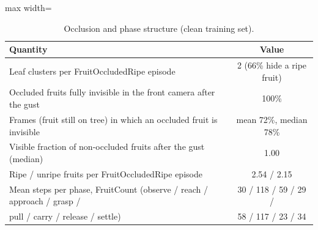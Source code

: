 \begin{table}[t]
\centering
\caption{Occlusion and phase structure (clean training set).}
\label{tab:occlusion}
\small
\begin{adjustbox}{max width=\textwidth}\begin{tabular}{lc}
\toprule
Quantity & Value\\
\midrule
Leaf clusters per FruitOccludedRipe episode & 2 (66\% hide a ripe fruit)\\
Occluded fruits fully invisible in the front camera after the gust & 100\%\\
Frames (fruit still on tree) in which an occluded fruit is invisible & mean 72\%, median 78\%\\
Visible fraction of non-occluded fruits after the gust (median) & 1.00\\
Ripe / unripe fruits per FruitOccludedRipe episode & 2.54 / 2.15\\
Mean steps per phase, FruitCount (observe / reach / approach / grasp / & 30 / 118 / 59 / 29 /\\
\quad pull / carry / release / settle) & 58 / 117 / 23 / 34\\
\bottomrule
\end{tabular}\end{adjustbox}
\end{table}
